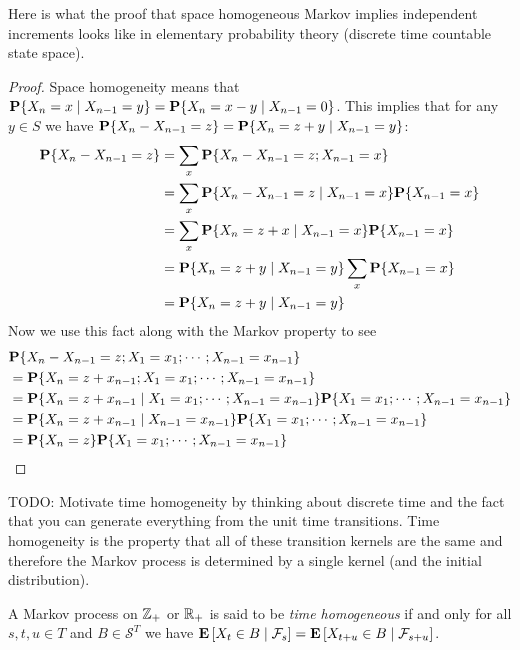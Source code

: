 Here is what the proof that space homogeneous Markov implies
independent increments looks like in elementary probability theory
(discrete time countable state space).
\begin{proof}
Space homogeneity means that $\cprobability{X_{n-1} = y}{X_n = x} =
\cprobability{X_{n-1} = 0}{X_n = x-y}$.  This implies that for any
$y\in S$ we have
$\probability{X_n - X_{n-1} = z} = \cprobability{X_{n-1} = y}{X_n =
  z+y}$:
\begin{align*}
\probability{X_n - X_{n-1} = z} &= \sum_x \probability{X_n - X_{n-1} =
  z ; X_{n-1}=x} \\
& =\sum_x \cprobability {X_{n-1}=x}{X_n - X_{n-1} =  z} \probability
{X_{n-1}=x} \\
& =\sum_x \cprobability {X_{n-1}=x}{X_n =  z+x} \probability
{X_{n-1}=x} \\
& =\cprobability {X_{n-1}=y}{X_n =  z+y} \sum_x \probability
{X_{n-1}=x} \\
&= \cprobability {X_{n-1}=y}{X_n =  z+y} 
\end{align*}
Now we use this fact along with the Markov property to see
\begin{align*}
&\probability{X_n - X_{n-1} = z; X_1=x_1 ; \cdots ; X_{n-1}=x_{n-1}} \\
&=\probability{X_n = z+x_{n-1}; X_1=x_1 ; \cdots ; X_{n-1}=x_{n-1}} \\
&=\cprobability{X_1=x_1 ; \cdots ; X_{n-1}=x_{n-1}}{X_n = z+x_{n-1}} 
\probability{X_1=x_1 ; \cdots ; X_{n-1}=x_{n-1}}\\
&=\cprobability{X_{n-1}=x_{n-1}}{X_n = z+x_{n-1}} 
\probability{X_1=x_1 ; \cdots ; X_{n-1}=x_{n-1}}\\
&=\probability{X_n = z} 
\probability{X_1=x_1 ; \cdots ; X_{n-1}=x_{n-1}}\\
\end{align*}
\end{proof}

TODO: Motivate time homogeneity by thinking about discrete time and
the fact that you can generate everything from the unit time
transitions.  Time homogeneity is the property that all of these
transition kernels are the same and therefore the Markov process is
determined by a single kernel (and the initial distribution).

\begin{defn}A Markov process on $\integers_+$ or $\reals_+$ is said to
  be \emph{time homogeneous} if and only for all $s,t,u \in T$ and $B
  \in \mathcal{S}^T$ we have
  $\cexpectationlong{\mathcal{F}_s}{X_t \in B} = \cexpectationlong{\mathcal{F}_{s+u}}{X_{t+u} \in B}$.
\end{defn}

